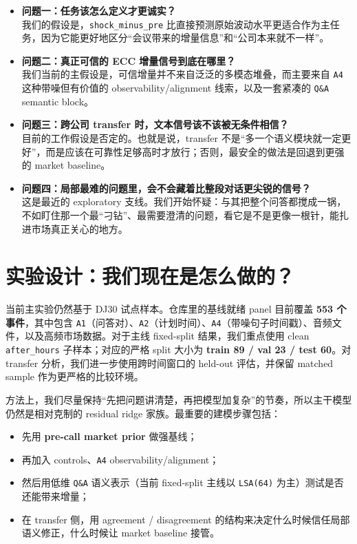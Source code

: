 \documentclass[11pt]{ctexart}
\begin{document}
\begin{itemize}
    \item \textbf{问题一：任务该怎么定义才更诚实？}\\
    我们的假设是，\texttt{shock\_minus\_pre} 比直接预测原始波动水平更适合作为主任务，因为它能更好地区分“会议带来的增量信息”和“公司本来就不一样”。

    \item \textbf{问题二：真正可信的 ECC 增量信号到底在哪里？}\\
    我们当前的主假设是，可信增量并不来自泛泛的多模态堆叠，而主要来自 \texttt{A4} 这种带噪但有价值的 observability/alignment 线索，以及一套紧凑的 \texttt{Q\&A} semantic block。

    \item \textbf{问题三：跨公司 transfer 时，文本信号该不该被无条件相信？}\\
    目前的工作假设是否定的。也就是说，transfer 不是“多一个语义模块就一定更好”，而是应该在可靠性足够高时才放行；否则，最安全的做法是回退到更强的 market baseline。

    \item \textbf{问题四：局部最难的问题里，会不会藏着比整段对话更尖锐的信号？}\\
    这是最近的 exploratory 支线。我们开始怀疑：与其把整个问答都搅成一锅，不如盯住那一个最“刁钻”、最需要澄清的问题，看它是不是更像一根针，能扎进市场真正关心的地方。
\end{itemize}

\section{实验设计：我们现在是怎么做的？}
当前主实验仍然基于 DJ30 试点样本。仓库里的基线就绪 panel 目前覆盖 \textbf{553 个事件}，其中包含 \texttt{A1}（问答对）、\texttt{A2}（计划时间）、\texttt{A4}（带噪句子时间戳）、音频文件，以及高频市场数据。对于主线 fixed-split 结果，我们重点使用 clean \texttt{after\_hours} 子样本；对应的严格 split 大小为 \textbf{train 89 / val 23 / test 60}。对 transfer 分析，我们进一步使用跨时间窗口的 held-out 评估，并保留 matched sample 作为更严格的比较环境。

方法上，我们尽量保持“先把问题讲清楚，再把模型加复杂”的节奏，所以主干模型仍然是相对克制的 residual ridge 家族。最重要的建模步骤包括：
\begin{itemize}
    \item 先用 \textbf{pre-call market prior} 做强基线；
    \item 再加入 controls、\texttt{A4} observability/alignment；
    \item 然后用低维 \texttt{Q\&A} 语义表示（当前 fixed-split 主线以 \texttt{LSA(64)} 为主）测试是否还能带来增量；
    \item 在 transfer 侧，用 agreement / disagreement 的结构来决定什么时候信任局部语义修正，什么时候让 market baseline 接管。
\end{itemize}
\end{document}

